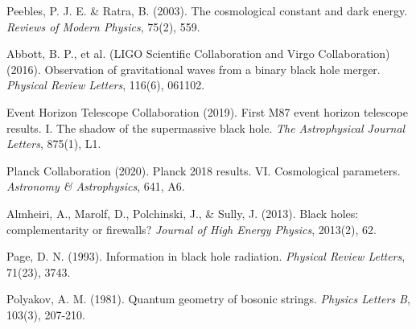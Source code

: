 \documentclass[12pt,a4paper]{article}
\begin{document}
\begin{thebibliography}{99}
Peebles, P. J. E. \& Ratra, B. (2003).
The cosmological constant and dark energy.
\textit{Reviews of Modern Physics}, 75(2), 559.

Abbott, B. P., et al. (LIGO Scientific Collaboration and Virgo Collaboration) (2016).
Observation of gravitational waves from a binary black hole merger.
\textit{Physical Review Letters}, 116(6), 061102.

Event Horizon Telescope Collaboration (2019).
First M87 event horizon telescope results. I. The shadow of the supermassive black hole.
\textit{The Astrophysical Journal Letters}, 875(1), L1.

Planck Collaboration (2020).
Planck 2018 results. VI. Cosmological parameters.
\textit{Astronomy \& Astrophysics}, 641, A6.

Almheiri, A., Marolf, D., Polchinski, J., \& Sully, J. (2013).
Black holes: complementarity or firewalls?
\textit{Journal of High Energy Physics}, 2013(2), 62.

Page, D. N. (1993).
Information in black hole radiation.
\textit{Physical Review Letters}, 71(23), 3743.

Polyakov, A. M. (1981).
Quantum geometry of bosonic strings.
\textit{Physics Letters B}, 103(3), 207-210.

\end{thebibliography}
\end{document}
